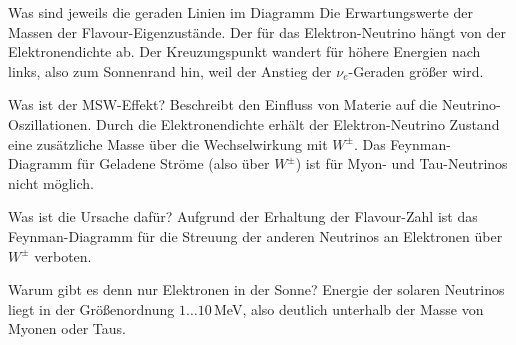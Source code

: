 \begin{fquestion}{Was sind jeweils die geraden Linien im Diagramm}
    Die Erwartungswerte der Massen der Flavour-Eigenzustände.
    Der für das Elektron-Neutrino hängt von der Elektronendichte ab.
    Der Kreuzungspunkt wandert für höhere Energien nach links, also zum Sonnenrand hin, weil der Anstieg der $\nu_e$-Geraden größer wird.
\end{fquestion}


\begin{fquestion}{Was ist der MSW-Effekt?}
    Beschreibt den Einfluss von Materie auf die Neutrino-Oszillationen. 
    Durch die Elektronendichte erhält der Elektron-Neutrino Zustand eine zusätzliche Masse über die Wechselwirkung mit $W^\pm$.
    Das Feynman-Diagramm für Geladene Ströme (also über $W^\pm$) ist für Myon- und Tau-Neutrinos nicht möglich.
\end{fquestion}

\begin{fquestion}{Was ist die Ursache dafür?}
    Aufgrund der Erhaltung der Flavour-Zahl ist das Feynman-Diagramm für die Streuung der anderen Neutrinos an Elektronen über $W^\pm$ verboten.
\end{fquestion}

\begin{fquestion}{Warum gibt es denn nur Elektronen in der Sonne?}
    Energie der solaren Neutrinos liegt in der Größenordnung  $1\dots 10\,$MeV, also deutlich unterhalb der Masse von Myonen oder Taus.
\end{fquestion}

